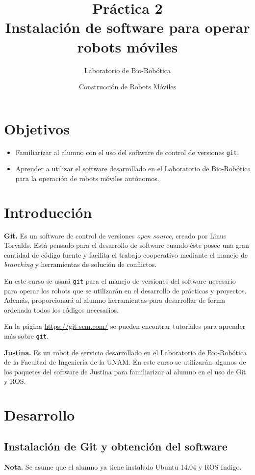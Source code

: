 \documentclass[letterpaper,12pt]{article}
\title{Práctica 2 \\ Instalación de software para operar robots móviles}
\author{Laboratorio de Bio-Robótica}
\date{Construcción de Robots Móviles}
\begin{document}
\renewcommand{\tablename}{Tabla}
\maketitle
\section*{Objetivos}
\begin{itemize}
\item Familiarizar al alumno con el uso del software de control de versiones \texttt{git}.
\item Aprender a utilizar el software desarrollado en el Laboratorio de Bio-Robótica para la operación de robots móviles autónomos. 
\end{itemize}

\section{Introducción}
\textbf{Git.} Es un software de control de versiones \textit{open source}, creado por Linus Torvalds. Está pensado para el desarrollo de software cuando éste posee una gran cantidad de código fuente y facilita el trabajo cooperativo mediante el manejo de \textit{branching} y herramientas de solución de conflictos. 

En este curso se usará \texttt{git} para el manejo de versiones del software necesario para operar los robots que se utilizarán en el desarrollo de prácticas y proyectos. Además, proporcionará al alumno herramientas para desarrollar de forma ordenada todos los códigos necesarios.

En la página \url{https://git-scm.com/} se pueden encontrar tutoriales para aprender más sobre \texttt{git}.

\textbf{Justina.} Es un robot de servicio desarrollado en el Laboratorio de Bio-Robótica de la Facultad de Ingeniería de la UNAM. En este curso se utilizarán algunos de los paquetes del software de Justina para familiarizar al alumno en el uso de Git y ROS. 

\section{Desarrollo}
\subsection{Instalación de Git y obtención del software}
\textbf{Nota.} Se asume que el alumno ya tiene instalado Ubuntu 14.04 y ROS Indigo. 
\end{document}
